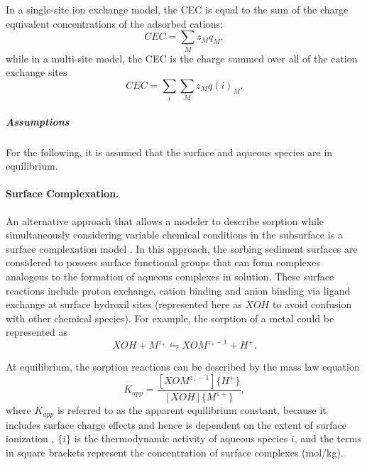 In a single-site ion exchange model, the CEC is equal to the sum of the charge equivalent concentrations of the adsorbed cations:
\begin{equation}
  CEC=\sum _{M}z_{M} q_{M},
\end{equation} 
while in a multi-site model, the CEC is the charge summed over all of the cation exchange sites \citep{cernik-1996, voegelin-2000}
\begin{equation}
  CEC=\sum _{i}\sum _{M}z_{M} q(i)_{M}   .
\end{equation} 

\subparagraph{Assumptions} 
For the following, it is assumed that the surface and aqueous species are in equilibrium.


\paragraph{Surface Complexation.} 
\label{sec:surfaceComplexation} An alternative approach that allows a modeler to describe sorption while
simultaneously considering variable chemical conditions in the subsurface is a surface complexation model \citep{davis-2004}.  
In this approach, the sorbing sediment surfaces are considered to possess
surface functional groups that can form complexes analogous to the
formation of aqueous complexes in solution.  
These surface reactions include proton exchange, cation binding and anion binding via ligand
exchange at surface hydroxil sites (represented here as $XOH$ to avoid
confusion with other chemical species). 
For example, the sorption of a metal could be represented as
%
\begin{equation} \label{eq:metalSorption} 
  XOH + M^{z_+} \leftrightharpoons XOM^{z_+ - 1} + H^{+}  .
\end{equation} 

At equilibrium, the sorption reactions can be described by the mass law equation
%
\begin{equation} \label{eq:sorptionMassAction}
  K_{app} =\frac{\left[XOM^{z_{+}-1 } \right]\{H^{+} \} }{\left[XOH\right] \{M^{z+} \} }  ,
\end{equation} 
where $K_{app}$ is referred to as the apparent equilibrium constant,
because it includes surface charge effects and hence is dependent on
the extent of surface ionization \citep{dzombak-1990}, $\{i\}$
is the thermodynamic activity of aqueous species $i$, and the terms in
square brackets represent the concentration of surface complexes (mol/kg).

